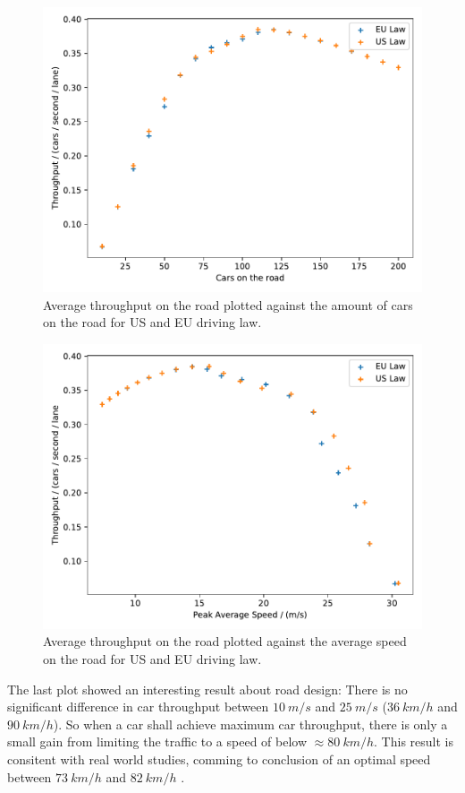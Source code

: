 \begin{figure}[H]
	\centering
	\includegraphics[width=0.9\linewidth]{media/throughput_cars.pdf}
	\caption{Average throughput on the road plotted against the amount of cars on the road for US and EU driving law.}
	\label{fig:throughput-cars}
\end{figure}

\begin{figure}[H]
	\centering
	\includegraphics[width=0.9\linewidth]{media/throughput_speed.pdf}
	\caption{Average throughput on the road plotted against the average speed on the road for US and EU driving law.}
	\label{fig:throughput-speed}
\end{figure}
The last plot showed an interesting result about road design: There is no significant difference in
car throughput between $\SI{10}{m/s}$ and $\SI{25}{m/s}$ ($\SI{36}{km/h}$ and $\SI{90}{km/h}$). So
when a car shall achieve maximum car throughput, there is only a small gain from limiting the
traffic to a speed of below $\approx \SI{80}{km/h}$. This result is consitent with real world
studies, comming to conclusion of an optimal speed between $\SI{73}{km/h}$ and $\SI{82}{km/h}$
\cite{HOSSEINLOU201536}.

